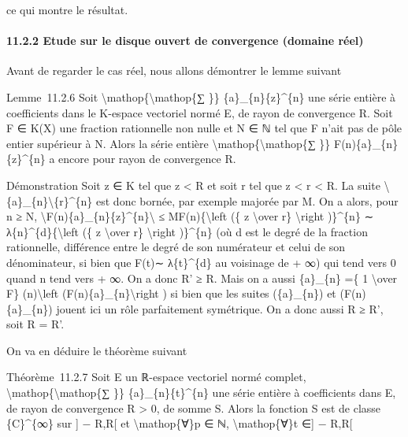 \documentclass[]{article}
\begin{document}
ce qui montre le résultat.

\paragraph{11.2.2 Etude sur le disque ouvert de convergence (domaine
réel)}

Avant de regarder le cas réel, nous allons démontrer le lemme suivant

Lemme~11.2.6 Soit \textbackslash{}mathop\{\textbackslash{}mathop\{∑ \}\}
\{a\}\_\{n\}\{z\}\^{}\{n\} une série entière à coefficients dans le
K-espace vectoriel normé E, de rayon de convergence R. Soit F ∈ K(X) une
fraction rationnelle non nulle et N ∈ ℕ tel que F n'ait pas de pôle
entier supérieur à N. Alors la série entière
\textbackslash{}mathop\{\textbackslash{}mathop\{∑ \}\}
F(n)\{a\}\_\{n\}\{z\}\^{}\{n\} a encore pour rayon de convergence R.

Démonstration Soit z ∈ K tel que \textbar{}z\textbar{} \textless{} R et
soit r tel que \textbar{}z\textbar{} \textless{} r \textless{} R. La
suite
\textbackslash{}\textbar{}\{a\}\_\{n\}\textbackslash{}\textbar{}\{r\}\^{}\{n\}
est donc bornée, par exemple majorée par M. On a alors, pour n ≥ N,
\textbackslash{}\textbar{}F(n)\{a\}\_\{n\}\{z\}\^{}\{n\}\textbackslash{}\textbar{}
≤ M\textbar{}F(n)\textbar{}\{\textbackslash{}left (\{
\textbar{}z\textbar{} \textbackslash{}over r\} \textbackslash{}right
)\}\^{}\{n\} ∼ λ\{n\}\^{}\{d\}\{\textbackslash{}left (\{
\textbar{}z\textbar{} \textbackslash{}over r\} \textbackslash{}right
)\}\^{}\{n\} (où d est le degré de la fraction rationnelle, différence
entre le degré de son numérateur et celui de son dénominateur, si bien
que \textbar{}F(t)\textbar{}∼ λ\{t\}\^{}\{d\} au voisinage de + ∞) qui
tend vers 0 quand n tend vers + ∞. On a donc R' ≥ R. Mais on a aussi
\{a\}\_\{n\} =\{ 1 \textbackslash{}over F\} (n)\textbackslash{}left
(F(n)\{a\}\_\{n\}\textbackslash{}right ) si bien que les suites
(\{a\}\_\{n\}) et (F(n)\{a\}\_\{n\}) jouent ici un rôle parfaitement
symétrique. On a donc aussi R ≥ R', soit R = R'.

On va en déduire le théorème suivant

Théorème~11.2.7 Soit E un ℝ-espace vectoriel normé complet,
\textbackslash{}mathop\{\textbackslash{}mathop\{∑ \}\}
\{a\}\_\{n\}\{t\}\^{}\{n\} une série entière à coefficients dans E, de
rayon de convergence R \textgreater{} 0, de somme S. Alors la fonction S
est de classe \{C\}\^{}\{∞\} sur {]} − R,R{[} et
\textbackslash{}mathop\{∀\}p ∈ ℕ, \textbackslash{}mathop\{∀\}t ∈{]} −
R,R{[}
\end{document}

